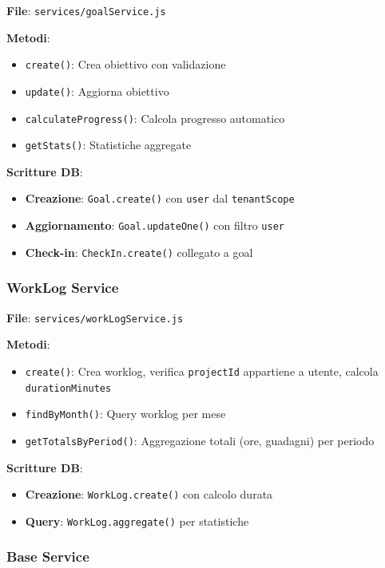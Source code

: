 \documentclass[11pt,a4paper]{article}
\begin{document}
\textbf{File}: \texttt{services/goalService.js}

\textbf{Metodi}:
\begin{itemize}
    \item \texttt{create()}: Crea obiettivo con validazione
    \item \texttt{update()}: Aggiorna obiettivo
    \item \texttt{calculateProgress()}: Calcola progresso automatico
    \item \texttt{getStats()}: Statistiche aggregate
\end{itemize}

\textbf{Scritture DB}:
\begin{itemize}
    \item \textbf{Creazione}: \texttt{Goal.create()} con \texttt{user} dal \texttt{tenantScope}
    \item \textbf{Aggiornamento}: \texttt{Goal.updateOne()} con filtro \texttt{user}
    \item \textbf{Check-in}: \texttt{CheckIn.create()} collegato a goal
\end{itemize}

\subsubsection{WorkLog Service}

\textbf{File}: \texttt{services/workLogService.js}

\textbf{Metodi}:
\begin{itemize}
    \item \texttt{create()}: Crea worklog, verifica \texttt{projectId} appartiene a utente, calcola \texttt{durationMinutes}
    \item \texttt{findByMonth()}: Query worklog per mese
    \item \texttt{getTotalsByPeriod()}: Aggregazione totali (ore, guadagni) per periodo
\end{itemize}

\textbf{Scritture DB}:
\begin{itemize}
    \item \textbf{Creazione}: \texttt{WorkLog.create()} con calcolo durata
    \item \textbf{Query}: \texttt{WorkLog.aggregate()} per statistiche
\end{itemize}

\subsubsection{Base Service}
\end{document}
